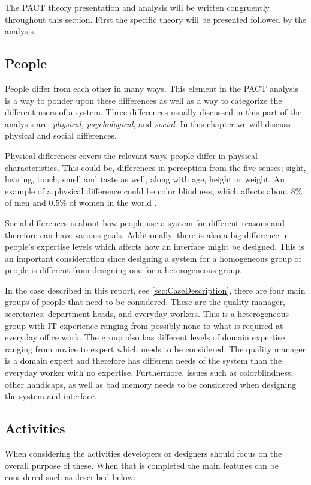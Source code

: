 The PACT theory presentation and analysis will be written congruently throughout this section.
First the specific theory will be presented followed by the analysis.

\subsection{People}\label{sec:PACT-people}
People differ from each other in many ways.
This element in the PACT analysis is a way to ponder upon these differences as well as a way to categorize the different users of a system.
Three differences usually discussed in this part of the analysis are; \textit{physical, psychological}, and \textit{social}.
In this chapter we will discuss physical and social differences.

Physical differences covers the relevant ways people differ in physical characteristics.
This could be, differences in perception from the five senses; sight, hearing, touch, smell and taste as well, along with age, height or weight.
An example of a physical difference could be color blindness, which affects about $8\%$ of men and $0.5\%$ of women in the world \cite{ColourBlind}.

Social differences is about how people use a system for different reasons and therefore can have various goals.
Additionally, there is also a big difference in people's expertise levels which affects how an interface might be designed.
This is an important consideration since designing a system for a homogeneous group of people is  different from designing one for a heterogeneous group.

In the case described in this report, see \cref{sec:CaseDescription}, there are four main groups of people that need to be considered.
These are the quality manager, secretaries, department heads, and everyday workers.
This is a heterogeneous group with IT experience ranging from possibly none to what is required at everyday office work.
The group also has different levels of domain expertise ranging from novice to expert which needs to be considered.
The quality manager is a domain expert and therefore has different needs of the system than the everyday worker with no expertise.
Furthermore, issues such as colorblindness, other handicaps, as well as bad memory needs to be considered when designing the system and interface.

\subsection{Activities}\label{sec:PACT-actvities}
When considering the activities developers or designers should focus on the overall purpose of these.
When that is completed the main features can be considered such as described below:

